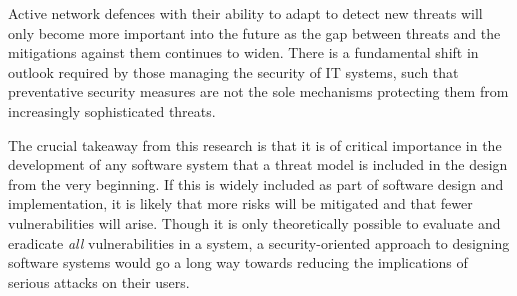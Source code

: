 Active network defences with their ability to adapt to detect new threats will only become more important into the future as the gap between threats and the mitigations against them continues to widen. There is a fundamental shift in outlook required by those managing the security of IT systems, such that preventative security measures are not the sole mechanisms protecting them from increasingly sophisticated threats.

The crucial takeaway from this research is that it is of critical importance in the development of any software system that a threat model is included in the design from the very beginning. If this is widely included as part of software design and implementation, it is likely that more risks will be mitigated and that fewer  vulnerabilities will arise. Though it is only theoretically possible to evaluate and eradicate \textit{all} vulnerabilities in a system, a security-oriented approach to designing software systems would go a long way towards reducing the implications of serious attacks on their users.
